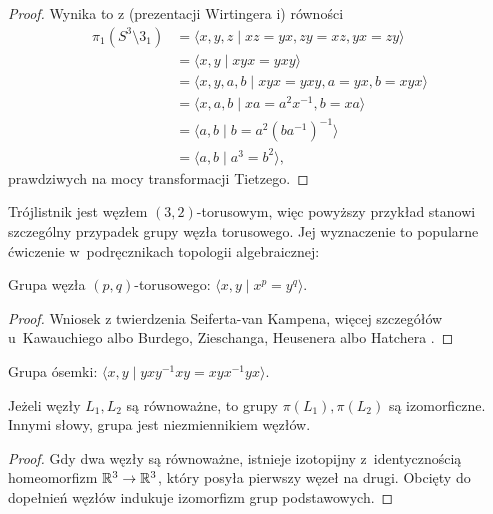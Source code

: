\begin{proof}
    Wynika to z (prezentacji Wirtingera i) równości
    \begin{align}
        \pi_1(S^3 \setminus 3_1) & = \langle x, y, z \mid xz = yx, zy = xz, yx = zy \rangle \\
                                 & = \langle x, y \mid xyx = yxy \rangle \\
                                 & = \langle x, y, a, b \mid xyx = yxy, a = yx, b = xyx \rangle \\
                                 & = \langle x, a, b \mid xa = a^2x^{-1}, b = xa \rangle \\
                                 & = \langle a, b \mid b = a^2(ba^{-1})^{-1} \rangle \\
                                 & = \langle a, b \mid a^3 = b^2 \rangle,
    \end{align}
    prawdziwych na mocy transformacji Tietzego.
\end{proof}

Trójlistnik jest węzłem $(3, 2)$-torusowym, więc powyższy przykład stanowi szczególny przypadek grupy węzła torusowego.
Jej wyznaczenie to popularne ćwiczenie w~podręcznikach topologii algebraicznej:

\begin{example}
    Grupa węzła $(p,q)$-torusowego: $\langle x, y \mid x^p = y^q \rangle$.
\end{example}

\begin{proof}
    Wniosek z twierdzenia Seiferta-van Kampena, więcej szczegółów u~Kawauchiego \cite[s. 77]{kawauchi1996} albo Burdego, Zieschanga, Heusenera \cite[s. 49]{burde2014} albo Hatchera \cite[s. 47]{hatcher2002}.
\end{proof}

\begin{example}
    Grupa ósemki: $\langle x, y \mid yxy^{{-1}}xy=xyx^{{-1}}yx \rangle$.
\end{example}

\begin{proposition}
    \label{prop:knot_group_invariant}
    Jeżeli węzły $L_1, L_2$ są równoważne, to grupy $\pi(L_1), \pi(L_2)$ są izomorficzne.
    Innymi słowy, grupa jest niezmiennikiem węzłów.
\end{proposition}

\begin{proof}
    Gdy dwa węzły są równoważne, istnieje izotopijny z~identycznością homeomorfizm $\mathbb R^3 \to \mathbb R^3$, który posyła pierwszy węzeł na drugi.
    Obcięty do dopełnień węzłów indukuje izomorfizm grup podstawowych.
\end{proof}

